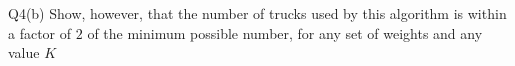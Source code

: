 \begin{problem}
    {Q4(b)}
    Show, however, that the number of trucks used by this algorithm is within a factor of $2$ of the minimum possible number, for any set of weights and any value $K$ \\
\end{problem}
